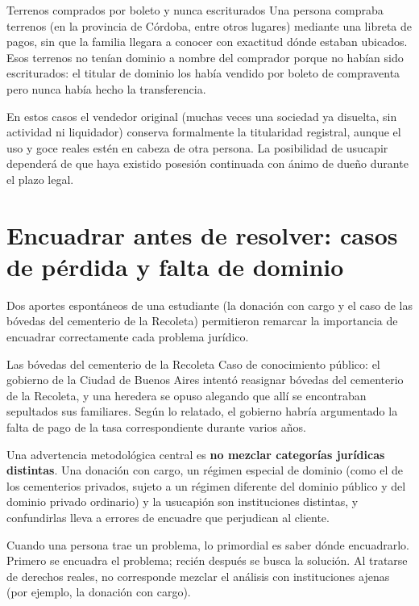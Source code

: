 \documentclass[12pt,oneside]{book}
\begin{document}
\begin{example}{Terrenos comprados por boleto y nunca escriturados}
Una persona compraba terrenos (en la provincia de Córdoba, entre otros lugares) mediante una libreta de pagos, sin que la familia llegara a conocer con exactitud dónde estaban ubicados. Esos terrenos no tenían dominio a nombre del comprador porque no habían sido escriturados: el titular de dominio los había vendido por boleto de compraventa pero nunca había hecho la transferencia.

En estos casos el vendedor original (muchas veces una sociedad ya disuelta, sin actividad ni liquidador) conserva formalmente la titularidad registral, aunque el uso y goce reales estén en cabeza de otra persona. La posibilidad de usucapir dependerá de que haya existido posesión continuada con ánimo de dueño durante el plazo legal.
\end{example}

\section{Encuadrar antes de resolver: casos de pérdida y falta de dominio}
\label{sec:casos-practicos}

Dos aportes espontáneos de una estudiante (la donación con cargo y el caso de las bóvedas del cementerio de la Recoleta) permitieron remarcar la importancia de encuadrar correctamente cada problema jurídico.

\begin{example}{Las bóvedas del cementerio de la Recoleta}
Caso de conocimiento público: el gobierno de la Ciudad de Buenos Aires intentó reasignar bóvedas del cementerio de la Recoleta, y una heredera se opuso alegando que allí se encontraban sepultados sus familiares. Según lo relatado, el gobierno habría argumentado la falta de pago de la tasa correspondiente durante varios años.
\end{example}

Una advertencia metodológica central es \textbf{no mezclar categorías jurídicas distintas}. Una donación con cargo, un régimen especial de dominio (como el de los cementerios privados, sujeto a un régimen diferente del dominio público y del dominio privado ordinario) y la usucapión son instituciones distintas, y confundirlas lleva a errores de encuadre que perjudican al cliente.

\begin{important}
Cuando una persona trae un problema, lo primordial es saber dónde encuadrarlo. Primero se encuadra el problema; recién después se busca la solución. Al tratarse de derechos reales, no corresponde mezclar el análisis con instituciones ajenas (por ejemplo, la donación con cargo).
\end{important}
\end{document}
